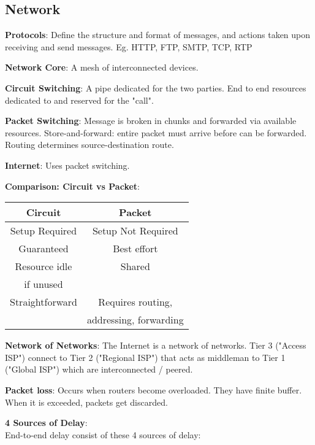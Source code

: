 \documentclass[a4paper,landscape]{article}
\newcommand{\rntopic}[1]{\vspace{-2.0em}\subsection*{#1}\vspace{-1.0em}}
\newcommand{\rnname}[1]{\textbf{#1}}
\begin{document}
\footnotesize
{}
\vspace*{-\baselineskip}\leavevmode
\vspace{-1.2cm}

\begin{multicols*}{4}

\raggedright

\rntopic{Network}
\begin{flatitemize}
\vspace{0.3cm}
\item \rnname{Protocols}: Define the structure and format of messages, and actions taken upon receiving and send messages. Eg. HTTP, FTP, SMTP, TCP, RTP
\item \rnname{Network Core}: A mesh of interconnected devices. 
\item \rnname{Circuit Switching}: A pipe dedicated for the two parties. End to end resources dedicated to and reserved for the "call".
\item \rnname{Packet Switching}: Message is broken in chunks and forwarded via available resources. Store-and-forward: entire packet must arrive before can be forwarded. Routing determines source-destination route.
\item \rnname{Internet}: Uses packet switching.
\item \rnname{Comparison: Circuit vs Packet}:
\begin{tabular}{ | c | c | } \hline
 Circuit & Packet \\ \hline
 Setup Required & Setup Not Required\\ \hline
 Guaranteed & Best effort \\  \hline
 Resource idle & Shared\\ if unused \\ \hline
 Straightforward & Requires routing,\\ & addressing, forwarding\\ \hline
\end{tabular}
\item \rnname{Network of Networks}: The Internet is a network of networks. Tier 3 ("Access ISP") connect to Tier 2 ("Regional ISP") that acts as middleman to Tier 1 ("Global ISP") which are interconnected / peered.
\item \rnname{Packet loss}: Occurs when routers become overloaded. They have finite buffer. When it is exceeded, packets get discarded. 
\item \rnname{4 Sources of Delay}: \\End-to-end delay consist of these 4 sources of delay:\\

\end{flatitemize}
\end{multicols*}
\end{document}
